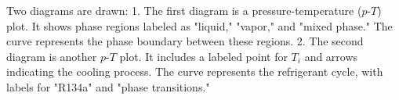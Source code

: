 Two diagrams are drawn:  
1. The first diagram is a pressure-temperature (\(p\)-\(T\)) plot. It shows phase regions labeled as "liquid," "vapor," and "mixed phase." The curve represents the phase boundary between these regions.  
2. The second diagram is another \(p\)-\(T\) plot. It includes a labeled point for \(T_i\) and arrows indicating the cooling process. The curve represents the refrigerant cycle, with labels for "R134a" and "phase transitions."